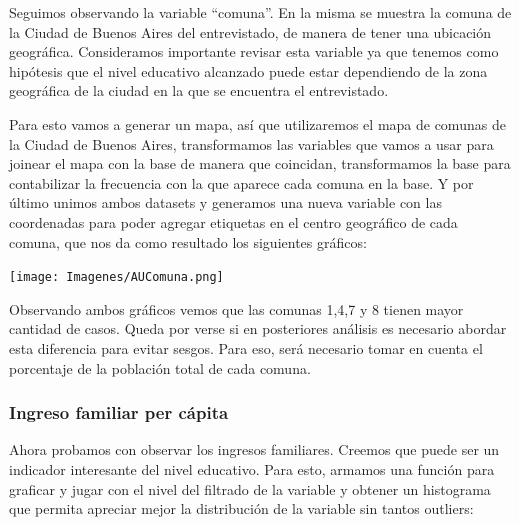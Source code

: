 \documentclass[a4paper]{article}
\begin{document}
            Seguimos observando la variable ``comuna''. En la misma se muestra la comuna de la Ciudad de Buenos Aires del entrevistado, de manera de tener una ubicación geográfica. Consideramos importante revisar esta variable ya que tenemos como hipótesis que el nivel educativo alcanzado puede estar dependiendo de la zona geográfica de la ciudad en la que se encuentra el entrevistado.
           
            Para esto vamos a generar un mapa, así que utilizaremos el mapa de comunas de la Ciudad de Buenos Aires, transformamos las variables que vamos a usar para joinear el mapa con la base de manera que coincidan, transformamos la base para contabilizar la frecuencia con la que aparece cada comuna en la base. Y por último unimos ambos datasets y generamos una nueva variable con las coordenadas para poder agregar etiquetas en el centro geográfico de cada comuna, que nos da como resultado los siguientes gráficos:
           
            \begin{center}
                \texttt{[image: Imagenes/AUComuna.png]}    
            \end{center}
 
            Observando ambos gráficos vemos que las comunas 1,4,7 y 8 tienen mayor cantidad de casos. Queda por verse si en posteriores análisis es necesario abordar esta diferencia para evitar sesgos. Para eso, será necesario tomar en cuenta el porcentaje de la población total de cada comuna.
           
            \subsubsection{Ingreso familiar per cápita}
           
            Ahora probamos con observar los ingresos familiares. Creemos que puede ser un indicador interesante del nivel educativo. Para esto, armamos una función para graficar y jugar con el nivel del filtrado de la variable y obtener un histograma que permita apreciar mejor la distribución de la variable sin tantos outliers:
           
\end{document}
